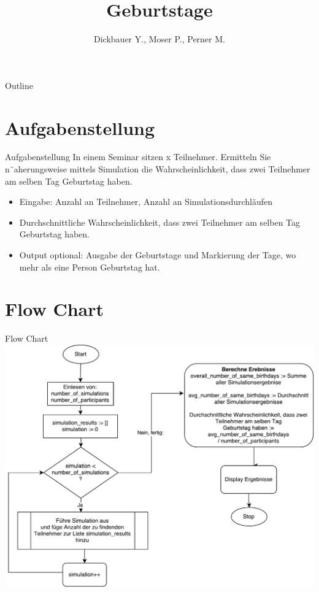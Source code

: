 

\title[BSP04 - Geburtstage]{Geburtstage}
\author{Dickbauer Y., Moser P., Perner M.}



\begin{frame}
  \titlepage
\end{frame}

\begin{frame}{Outline}
  \tableofcontents
\end{frame}

\section{Aufgabenstellung}
\begin{frame}{Aufgabenstellung}
In einem Seminar sitzen x Teilnehmer. Ermitteln Sie n¨aherungsweise mittels Simulation
die Wahrscheinlichkeit, dass zwei Teilnehmer am selben Tag Geburtstag haben.

\begin{itemize}
  \item Eingabe: Anzahl an Teilnehmer, Anzahl an Simulationsdurchläufen
  \item Durchschnittliche Wahrscheinlichkeit, dass zwei Teilnehmer am selben Tag
Geburtstag haben.
  \item Output optional: Ausgabe der Geburtstage und Markierung der Tage, wo mehr als
eine Person Geburtstag hat.
\end{itemize}

\end{frame}

\section{Flow Chart}
\begin{frame}{Flow Chart}
	\centering
  	\includegraphics[scale=0.4]{BSP04_Flow_Chart_1.pdf}
\end{frame}
